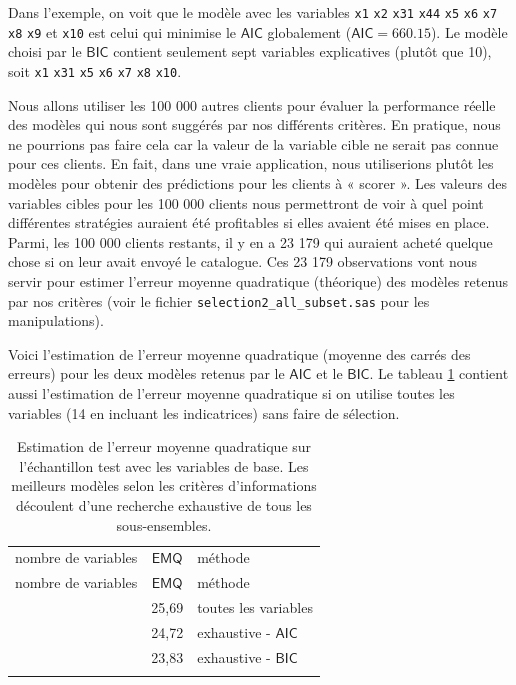 \documentclass[
  11pt,
  letterpaper,
]{book}
\theoremstyle{definition}
\theoremstyle{definition}
\theoremstyle{definition}
\theoremstyle{remark}
\begin{document}
Dans l'exemple, on voit que le modèle avec les variables \texttt{x1} \texttt{x2} \texttt{x31} \texttt{x44} \texttt{x5} \texttt{x6} \texttt{x7} \texttt{x8} \texttt{x9} et \texttt{x10} est celui qui minimise le \(\mathsf{AIC}\) globalement (\(\mathsf{AIC}=660.15\)). Le modèle choisi par le \(\mathsf{BIC}\) contient seulement sept variables explicatives (plutôt que 10), soit \texttt{x1} \texttt{x31} \texttt{x5} \texttt{x6} \texttt{x7} \texttt{x8} \texttt{x10}.

Nous allons utiliser les 100 000 autres clients pour évaluer la performance réelle des modèles qui nous sont suggérés par nos différents critères. En pratique, nous ne pourrions pas faire cela car la valeur de la variable cible ne serait pas connue pour ces clients. En fait, dans une vraie application, nous utiliserions plutôt les modèles pour obtenir des prédictions pour les clients à « scorer ». Les valeurs des variables cibles pour les 100 000 clients nous permettront de voir à quel point différentes stratégies auraient été profitables si elles avaient été mises en place. Parmi, les 100 000 clients restants, il y en a 23 179 qui auraient acheté quelque chose si on leur avait envoyé le catalogue. Ces 23 179 observations vont nous servir pour estimer l'erreur moyenne quadratique (théorique) des modèles retenus par nos critères (voir le fichier \texttt{selection2\_all\_subset.sas} pour les manipulations).

Voici l'estimation de l'erreur moyenne quadratique (moyenne des carrés des erreurs) pour les deux modèles retenus par le \(\mathsf{AIC}\) et le \(\mathsf{BIC}\). Le tableau \ref{tab:02-gmse-base} contient aussi l'estimation de l'erreur moyenne quadratique si on utilise toutes les variables (14 en incluant les indicatrices) sans faire de sélection.

\begin{longtable}[]{@{}ccl@{}}
\caption{\label{tab:02-gmse-base} Estimation de l'erreur moyenne quadratique sur l'échantillon test avec les variables de base. Les meilleurs modèles selon les critères d'informations découlent d'une recherche exhaustive de tous les sous-ensembles.}\tabularnewline
\toprule
nombre de variables & \(\mathsf{EMQ}\) & méthode \\ \addlinespace
\midrule
\endfirsthead
\toprule
nombre de variables & \(\mathsf{EMQ}\) & méthode \\ \addlinespace
\midrule
\endhead
14 & 25,69 & toutes les variables \\ \addlinespace
10 & 24,72 & exhaustive - \(\mathsf{AIC}\) \\ \addlinespace
7 & 23,83 & exhaustive - \(\mathsf{BIC}\) \\ \addlinespace
\bottomrule
\end{longtable}
\end{document}
